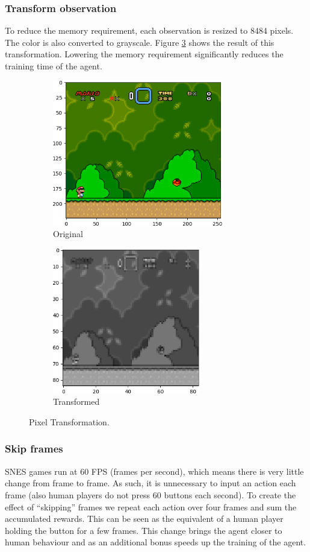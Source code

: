 \documentclass[a4paper]{article}
\begin{document}
\subsubsection{Transform observation}
To reduce the memory requirement, each observation is resized to 84\texttimes{}84 pixels.
The color is also converted to grayscale.
Figure \ref{fig:transformation} shows the result of this transformation.
Lowering the memory requirement significantly reduces the training time of the agent.
\begin{figure}[htbp]
    \centering
    \begin{subfigure}{.5\textwidth}
        \centering
        \includegraphics[height=6.35cm]{original_crop}
        \caption{Original}
        \label{fig:transformation:sub1}
    \end{subfigure}%
    \begin{subfigure}{.5\textwidth}
        \centering
        \includegraphics[height=6.35cm]{grayscale_crop}
        \caption{Transformed}
        \label{fig:transformation:sub2}
    \end{subfigure}
    \caption{Pixel Transformation.}
    \label{fig:transformation}
\end{figure}

\subsubsection{Skip frames}
SNES games run at 60 FPS (frames per second), which means there is very little change from frame to frame.
As such, it is unnecessary to input an action each frame (also human players do not press 60 buttons each second).
To create the effect of ``skipping'' frames we repeat each action over four frames and sum the accumulated rewards.
This can be seen as the equivalent of a human player holding the button for a few frames.
This change brings the agent closer to human behaviour and as an additional bonus speeds up the training of the agent.
\end{document}
